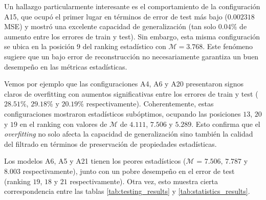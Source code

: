 Un hallazgo particularmente interesante es el comportamiento de la configuración A15, que ocupó el primer lugar en términos de error de test más bajo ($0.002318$ MSE) y mostró una excelente capacidad de generalización (tan solo $0.04\%$ de aumento entre los errores de train y test). Sin embargo, esta misma configuración se ubica en la posición $9$ del ranking estadístico con $\mathcal{M} = 3.768$. Este fenómeno sugiere que un bajo error de reconstrucción no necesariamente garantiza un buen desempeño en las métricas estadísticas.

Vemos por ejemplo que las configuraciones A4, A6 y A20 presentaron signos claros de overfitting con aumentos significativas entre los errores de train y test ($28.51\%$, $29.18\%$ y $20.19\%$ respectivamente). Coherentemente, estas configuraciones mostraron estadísticos subóptimos, ocupando las posiciones $13$, $20$ y $19$ en el ranking con valores de $\mathcal{M}$ de $4.111$, $7.506$ y $5.289$. Esto confirma que el \emph{overfitting} no solo afecta la capacidad de generalización sino también la calidad del filtrado en términos de preservación de propiedades estadísticas.

Los modelos A6, A5 y A21 tienen los peores estadísticos ($\mathcal{M}$ = $7.506$, $7.787$ y $8.003$ respectivamente), junto con un pobre desempeño en el error de test (ranking $19$, $18$ y $21$ respectivamente). Otra vez, esto muestra cierta correspondencia entre las tablas \ref{tab:testing_results} y \ref{tab:statistics_results}.

